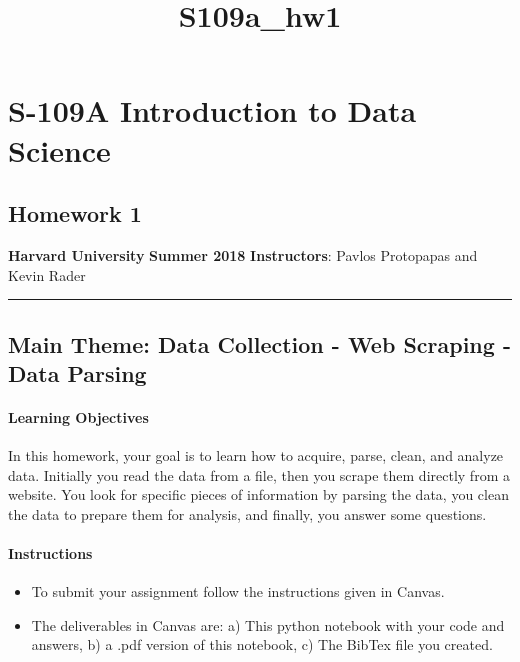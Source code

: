 \documentclass[11pt]{article}
\title{S109a\_hw1}
\providecommand{\tightlist}{%
      \setlength{\itemsep}{0pt}\setlength{\parskip}{0pt}}
\begin{document}
    
    
    \maketitle
    
    

    
    \section{ S-109A Introduction to Data
Science}\label{s-109a-introduction-to-data-science}

\subsection{Homework 1}\label{homework-1}

\textbf{Harvard University} \textbf{Summer 2018} \textbf{Instructors}:
Pavlos Protopapas and Kevin Rader

\begin{center}\rule{0.5\linewidth}{\linethickness}\end{center}

\subsection{Main Theme: Data Collection - Web Scraping - Data
Parsing}\label{main-theme-data-collection---web-scraping---data-parsing}

\paragraph{Learning Objectives}\label{learning-objectives}

In this homework, your goal is to learn how to acquire, parse, clean,
and analyze data. Initially you read the data from a file, then you
scrape them directly from a website. You look for specific pieces of
information by parsing the data, you clean the data to prepare them for
analysis, and finally, you answer some questions.

\paragraph{Instructions}\label{instructions}

\begin{itemize}
\tightlist
\item
  To submit your assignment follow the instructions given in Canvas.
\item
  The deliverables in Canvas are: a) This python notebook with your code
  and answers, b) a .pdf version of this notebook, c) The BibTex file
  you created.
\end{itemize}
\end{document}
